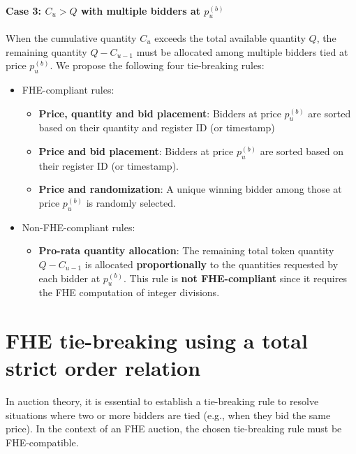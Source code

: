 \paragraph{Case 3: $C_u > Q$ with multiple bidders at $p_u^{(b)}$}
When the cumulative quantity $C_u$ exceeds the total available quantity $Q$, the remaining quantity $Q - C_{u-1}$ must be allocated among multiple bidders tied at price $p_u^{(b)}$. We propose the following four tie-breaking rules:
\begin{itemize}
    \item FHE-compliant rules:
    \begin{itemize}
        \item \textbf{Price, quantity and bid placement}: Bidders at price $p_u^{(b)}$ are sorted based on their quantity and register ID (or timestamp)
        \item \textbf{Price and bid placement}: Bidders at price $p_u^{(b)}$ are sorted based on their register ID (or timestamp).
        \item \textbf{Price and randomization}: A unique winning bidder among those at price $p_u^{(b)}$ is randomly selected.
    \end{itemize}
    \item Non-FHE-compliant rules:
    \begin{itemize}
        \item \textbf{Pro-rata quantity allocation}: The remaining total token quantity $Q - C_{u-1}$ is allocated \textbf{proportionally} to the quantities requested by each bidder at $p_u^{(b)}$. This rule is \textbf{not FHE-compliant} since it requires the FHE computation of integer divisions.
    \end{itemize}
\end{itemize}


\section{FHE tie-breaking using a total strict order relation}

In auction theory, it is essential to establish a tie-breaking rule to resolve situations where two or more bidders are tied (e.g., when they bid the same price). In the context of an FHE auction, the chosen tie-breaking rule must be FHE-compatible.

